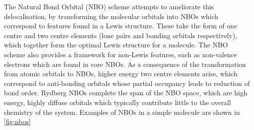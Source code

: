 \begin{refsection}
The Natural Bond Orbital (NBO) scheme attempts to ameliorate this delocalisation, by transforming the molecular orbitals into NBOs which correspond to features found in a Lewis structure.\autocite{Reed1988}
These take the form of one centre and two centre elements (lone pairs and bonding orbitals respectively), which together form the optimal Lewis structure for a molecule.
The NBO scheme also provides a framework for non-Lewis features, such as non-valence electrons which are found in core NBOs.
As a consequence of the transformation from atomic orbitals to NBOs, higher energy two centre elements arise, which correspond to anti-bonding orbitals whose partial occupancy leads to reduction of bond order.
Rydberg NBOs complete the span of the NBO space, which are high energy, highly diffuse orbitals which typically contribute little to the overall chemistry of the system. 
Examples of NBOs in a simple molecule are shown in \cref{fig:nbos}


\end{refsection}
